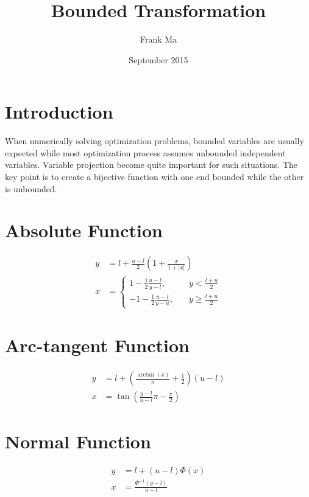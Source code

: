 \documentclass{article}
\title{Bounded Transformation}
\author{Frank Ma}
\date{September 2015}
\begin{document}
\maketitle

\section{Introduction}

When numerically solving optimization problems, bounded variables are usually expected while most optimization process assumes unbounded independent variables.
Variable projection become quite important for such situations.
The key point is to create a bijective function with one end bounded while the other is unbounded.


\section{Absolute Function}

\begin{subequations}
\begin{align}
    y &= l + \frac{u - l}{2} \left(1 + \frac{x}{1 + \left|x\right|}\right) \\
    x &= \begin{cases}
            1 - \frac{1}{2} \frac{u - l}{y - l}, \quad & y < \frac{l + u}{2} \\
            -1 - \frac{1}{2} \frac{u - l}{y - u}, \quad & y \geq \frac{l + u}{2}
        \end{cases}
\end{align}
\end{subequations}


\section{Arc-tangent Function}

\begin{subequations}
\begin{align}
    y &= l + \left(\frac{\arctan(x)}{\pi} + \frac{1}{2}\right) \left(u - l \right) \\
    x &= \tan\left(\frac{y - l}{u - l}\pi - \frac{\pi}{2}\right)
\end{align}
\end{subequations}


\section{Normal Function}

\begin{subequations}
\begin{align}
    y &= l + \left(u - l\right) \Phi(x) \\
    x &= \frac{\Phi^{-1}(y - l)}{u - l}
\end{align}
\end{subequations}
\end{document}

